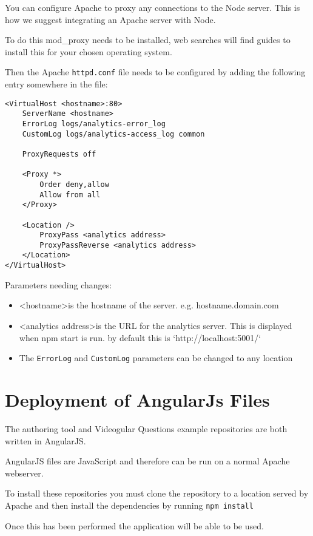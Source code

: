 You can configure Apache to proxy any connections to the Node server. This is how we suggest integrating an Apache server with Node.

To do this mod\_proxy needs to be installed, web searches will find guides to install this for your chosen operating system.

Then the Apache \lstinline|httpd.conf| file needs to be configured by adding the following entry somewhere in the file:

\begin{lstlisting}[caption={Apache configuration}, label={code:apacheConfig_nodejs}]
<VirtualHost <hostname>:80>
	ServerName <hostname>
	ErrorLog logs/analytics-error_log
	CustomLog logs/analytics-access_log common

	ProxyRequests off
	
	<Proxy *>
		Order deny,allow
		Allow from all
	</Proxy>

	<Location />
		ProxyPass <analytics address>
		ProxyPassReverse <analytics address>
	</Location>
</VirtualHost>
\end{lstlisting}

Parameters needing changes:

\begin{itemize}
\item \textless hostname\textgreater is the hostname of the server. e.g. hostname.domain.com
\item \textless analytics address\textgreater is the URL for the analytics server. This is displayed when npm start is run. by default this is `http://localhost:5001/`
\item The \lstinline|ErrorLog| and \lstinline|CustomLog| parameters can be changed to any location
\end{itemize}

\section{Deployment of AngularJs Files} \label{Section:Deployment of AngularJs Files}

The authoring tool and \gls{Videogular} Questions example repositories are both written in AngularJS.

AngularJS files are JavaScript and therefore can be run on a normal Apache webserver.

To install these repositories you must clone the repository to a location served by Apache and then install the dependencies by running \lstinline|npm install|

Once this has been performed the application will be able to be used.